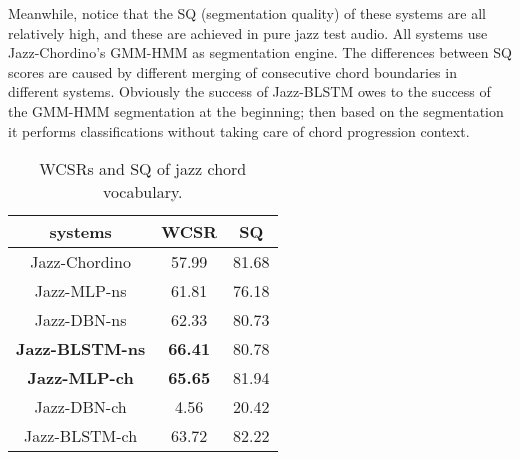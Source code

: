 Meanwhile, notice that the SQ (segmentation quality) of these systems are all relatively high, and these are achieved in pure jazz test audio. All systems use Jazz-Chordino's GMM-HMM as segmentation engine. The differences between SQ scores are caused by different merging of consecutive chord boundaries in different systems. Obviously the success of Jazz-BLSTM owes to the success of the GMM-HMM segmentation at the beginning; then based on the segmentation it performs classifications without taking care of chord progression context.

\begin{table}[t]
\centering
\footnotesize
\begin{tabular}{|c|c|c|} \hline
systems & WCSR & SQ\\ \hline
Jazz-Chordino & 57.99 & 81.68\\ \hline
Jazz-MLP-ns & 61.81& 76.18\\ \hline
Jazz-DBN-ns & 62.33& 80.73\\ \hline
\textbf{Jazz-BLSTM-ns} & \textbf{66.41} & 80.78\\ \hline
\textbf{Jazz-MLP-ch} & \textbf{65.65} & 81.94\\ \hline
Jazz-DBN-ch & 4.56& 20.42\\ \hline
Jazz-BLSTM-ch & 63.72 & 82.22\\ \hline
\end{tabular}
\caption{WCSRs and SQ of jazz chord vocabulary.}
\label{tab:5-jazz-wcsr}
\end{table}

